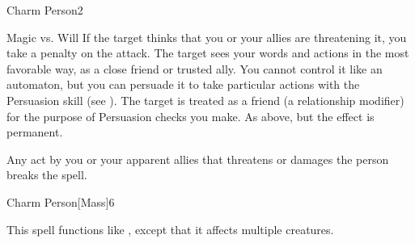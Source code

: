 \begin{spellsection}{Charm Person}{2}
\begin{spellheader}
\end{spellheader}
\begin{spellcontent}
    \begin{spelltargetinginfo}
    \end{spelltargetinginfo}
    \begin{spelleffects}
        \begin{spellattack}{Magic vs. Will}
            \spellspecial If the target thinks that you or your allies are threatening it, you take a  penalty on the attack.
            \spellsuccess The target sees your words and actions in the most favorable way, as a close friend or trusted ally. You cannot control it like an automaton, but you can persuade it to take particular actions with the Persuasion skill (see ). The target is treated as a friend (a  relationship modifier) for the purpose of Persuasion checks you make.
            \spellcritical As above, but the effect is permanent.
        \end{spellattack}
        \spelldur \durlong
    \end{spelleffects}
\end{spellcontent}
\begin{spellfooter}
    \spellnotes Any act by you or your apparent allies that threatens or damages the  person breaks the spell.

    \subtlespellnotes

    \norepeatspellnotes
\end{spellfooter}
\end{spellsection}

\begin{spellsection}{Charm Person}[Mass]{6}
\begin{spellheader}
\end{spellheader}
\begin{spellcontent}
    \begin{spelltargetinginfo}
    \end{spelltargetinginfo}
    \begin{spelleffects}
        \spelleffect This spell functions like , except that it affects multiple creatures.
    \end{spelleffects}
\end{spellcontent}
\begin{spellfooter}
\end{spellfooter}
\end{spellsection}

